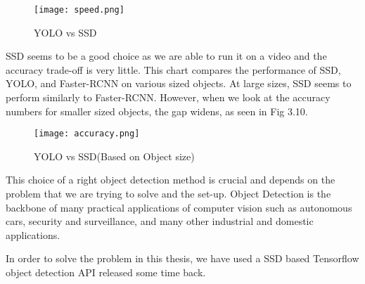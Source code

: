 		\begin{figure}[htb]
			\centering
			\texttt{[image: speed.png]}
			\caption{YOLO vs SSD\label{YOLO vs SSD}}
		\end{figure}
		
		SSD seems to be a good choice as we are able to run it on a video and the accuracy trade-off is very little. This chart compares the performance of SSD, YOLO, and Faster-RCNN on various sized objects. At large sizes, SSD seems to perform similarly to Faster-RCNN. However, when we look at the accuracy numbers for smaller sized objects, the gap widens, as seen in Fig 3.10.
		
		\begin{figure}[ht!]
			\centering
			\texttt{[image: accuracy.png]}
			\caption{YOLO vs SSD(Based on Object size)\label{YOLO vs SSD}}
		\end{figure}
		
		This choice of a right object detection method is crucial and depends on the problem that we are trying to solve and the set-up. Object Detection is the backbone of many practical applications of computer vision such as autonomous cars, security and surveillance, and many other industrial and domestic applications.
		
		In order to solve the problem in this thesis, we have used a SSD based Tensorflow object detection API released some time back.
		
		
		
		
		